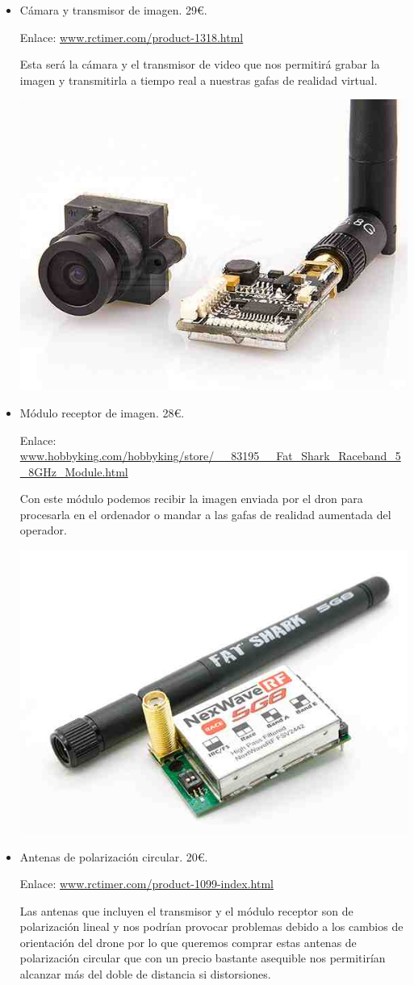 \documentclass[12pt,twoside]{report}
\begin{document}
\begin{itemize}
\item Cámara y transmisor de imagen. 29\euro{}.

Enlace: \url{www.rctimer.com/product-1318.html}

Esta será la cámara y el transmisor de video que nos permitirá grabar la imagen y transmitirla a tiempo real a nuestras gafas de realidad virtual.

\centerline{
    \includegraphics[width=0.45\linewidth]{fotos/camara.jpg}}


\item Módulo receptor de imagen. 28\euro{}.

Enlace: \url{www.hobbyking.com/hobbyking/store/__83195__Fat_Shark_Raceband_5_8GHz_Module.html}

Con este módulo podemos recibir la imagen enviada por el dron para procesarla en el ordenador o mandar a las gafas de realidad aumentada del operador.

\centerline{
    \includegraphics[width=0.45\linewidth]{fotos/receptor.jpg}}

\item Antenas de polarización circular. 20\euro{}.

Enlace: \url{www.rctimer.com/product-1099-index.html}

Las antenas que incluyen el transmisor y el módulo receptor son de polarización lineal y nos podrían provocar problemas debido a los cambios de orientación del drone por lo que queremos comprar estas antenas de polarización circular que con un precio bastante asequible nos permitirían alcanzar más del doble de distancia si distorsiones.



\end{itemize}
\end{document}
